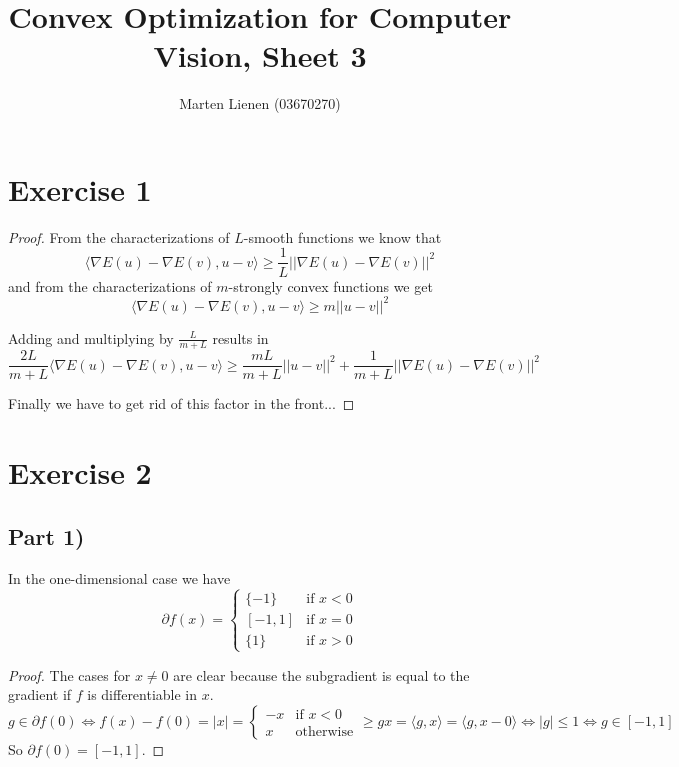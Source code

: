 \documentclass[10pt,a4paper]{article}
\title{Convex Optimization for Computer Vision, Sheet 3}
\author{Marten Lienen (03670270)}
\begin{document}
\maketitle

\section*{Exercise 1}

\begin{proof}
  From the characterizations of $L$-smooth functions we know that
  \begin{equation*}
    \langle \nabla E(u) - \nabla E(v), u - v \rangle \ge \frac{1}{L} ||\nabla E(u) - \nabla E(v)||^{2}
  \end{equation*}
  and from the characterizations of $m$-strongly convex functions we get
  \begin{equation*}
    \langle \nabla E(u) - \nabla E(v), u - v \rangle \ge m||u - v||^{2}
  \end{equation*}

  Adding and multiplying by $\frac{L}{m + L}$ results in
  \begin{equation*}
    \frac{2L}{m + L} \langle \nabla E(u) - \nabla E(v), u - v \rangle \ge \frac{mL}{m + L} ||u - v||^{2} + \frac{1}{m + L} ||\nabla E(u) - \nabla E(v)||^{2}
  \end{equation*}

  Finally we have to get rid of this factor in the front...
\end{proof}

\section*{Exercise 2}

\subsection*{Part 1)}

In the one-dimensional case we have
\begin{equation*}
  \partial f(x) = \begin{cases}
    \{ -1 \} & \text{if $x < 0$}\\
    [-1, 1] & \text{if $x = 0$}\\
    \{ 1 \} & \text{if $x > 0$}
  \end{cases}
\end{equation*}

\begin{proof}
  The cases for $x \ne 0$ are clear because the subgradient is equal to the gradient if $f$ is differentiable in $x$.
  \begin{equation*}
    g \in \partial f(0) \Leftrightarrow f(x) - f(0) = |x| = \begin{cases}
      -x & \text{if $x < 0$}\\
      x & \text{otherwise}
    \end{cases} \ge gx = \langle g, x \rangle = \langle g, x - 0 \rangle \Leftrightarrow |g| \le 1 \Leftrightarrow g \in [-1, 1]
  \end{equation*}
  So $\partial f(0) = [-1, 1]$.
\end{proof}
\end{document}
